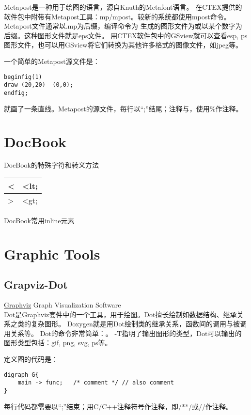 \documentclass[a4paper,11pt,oneside,openany]{book}
\begin{document}
\begin{CJK*}{GBK}{song}
Metapost是一种用于绘图的语言，源自Knuth的Metafont语言。
在CTEX提供的软件包中附带有Metapost工具：mp/mpost。较新的系统都使用mpost命令。
Metapost文件通常以.mp为后缀，编译命令为
生成的图形文件为或以某个数字为后缀。这种图形文件就是eps文件。
用CTEX软件包中的GSview就可以查看esp, ps图形文件，也可以用GSview将它们转换为其他许多格式的图像文件，如jpeg等。

一个简单的Metapost源文件是：
\begin{lstlisting}
beginfig(1)
draw (20,20)--(0,0);
endfig;
\end{lstlisting}
就画了一条直线。Metapost的源文件，每行以``;''结尾；注释与，使用\%作注释。


\chapter{DocBook}
DocBook的特殊字符和转义方法
\begin{tabular}{|l|l|}
\hline
< & <lt;    \\ \hline
> & <gt;    \\ \hline
\end{tabular}

DocBook常用inline元素


\chapter{Graphic Tools}

\section{Grapviz-Dot}
\noindent\href{http://www.graphviz.org/}{Graphviz} Graph Visualization Software\\

Dot是Graphviz套件中的一个工具，用于绘图。Dot擅长绘制如数据结构、继承关系之类的复杂图形。
Doxygen就是用Dot绘制类的继承关系，函数间的调用与被调用关系等。
Dot的命令非常简单：。
-T指明了输出图形的类型，Dot可以输出的图形类型包括：gif, png, svg, ps等。

定义图的代码是：
\begin{verbatim}
digraph G{
    main -> func;   /* comment */ // also comment
}
\end{verbatim}
每行代码都需要以``;''结束；用C/C++注释符号作注释，即/**/或//作注释。


\end{CJK*}
\end{document}
